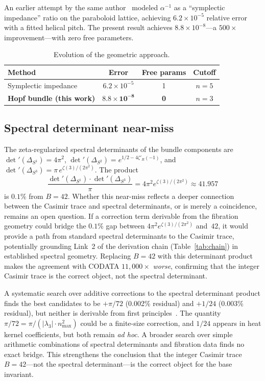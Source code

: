 \documentclass[aps,prl,twocolumn,superscriptaddress]{revtex4-2}
\begin{document}
An earlier attempt by the same author~\cite{paper2_old} modeled
$\alpha^{-1}$ as a ``symplectic impedance'' ratio on the
paraboloid lattice, achieving $6.2 \times 10^{-5}$ relative error
with a fitted helical pitch. The present result achieves
$8.8 \times 10^{-8}$---a $500\times$ improvement---with zero free
parameters.

\begin{table}[h]
\centering
\begin{tabular}{lccc}
\hline\hline
Method & Error & Free params & Cutoff \\
\hline
Symplectic impedance~\cite{paper2_old} & $6.2\times 10^{-5}$ & 1 & $n=5$ \\
\textbf{Hopf bundle (this work)} & $\mathbf{8.8\times 10^{-8}}$ & \textbf{0} & $n=3$ \\
\hline\hline
\end{tabular}
\caption{Evolution of the geometric approach.}
\label{tab:evolution}
\end{table}


\subsection{Spectral determinant near-miss}

The zeta-regularized spectral determinants of the bundle components
are $\det'(\Delta_{S^1}) = 4\pi^2$,
$\det'(\Delta_{S^2}) = e^{1/2 - 4\zeta'_R(-1)}$, and
$\det'(\Delta_{S^3}) = \pi\, e^{\zeta(3)/(2\pi^2)}$. The product
\begin{equation}
  \frac{\det'(\Delta_{S^1}) \cdot \det'(\Delta_{S^3})}{\pi}
  = 4\pi^2 e^{\zeta(3)/(2\pi^2)} \approx 41.957
\end{equation}
is $0.1\%$ from $B = 42$. Whether this near-miss reflects a deeper
connection between the Casimir trace and spectral determinants, or is
merely a coincidence, remains an open question. If a correction term
derivable from the fibration geometry could bridge the $0.1\%$ gap
between $4\pi^2 e^{\zeta(3)/(2\pi^2)}$ and~$42$, it would provide a
path from standard spectral determinants to the Casimir trace,
potentially grounding Link~2 of the derivation chain
(Table~\ref{tab:chain}) in established spectral geometry. Replacing $B = 42$
with this determinant product makes the agreement with CODATA
$11{,}000\times$ \textit{worse}, confirming that the integer Casimir
trace is the correct object, not the spectral determinant.

A systematic search over additive corrections to the spectral
determinant product finds the best candidates to be $+\pi/72$ (0.002\%
residual) and $+1/24$ (0.003\% residual), but neither is derivable from
first principles~\cite{phase2_kappa}. The quantity $\pi/72 =
\pi/(|\lambda_3| \cdot n_{\max}^2)$ could be a finite-size correction,
and $1/24$ appears in heat kernel coefficients, but both remain
\textit{ad hoc}. A broader search over simple arithmetic combinations of
spectral determinants and fibration data finds no exact bridge. This
strengthens the conclusion that the integer Casimir trace $B = 42$---not
the spectral determinant---is the correct object for the base invariant.
\end{document}
